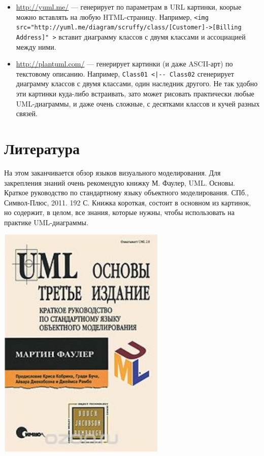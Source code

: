 \documentclass[a5paper]{article}
\newlength\Colsep
\begin{document}
\begin{itemize}
\begin{itemize}
		\item \url{http://yuml.me/} --- генерирует по параметрам в URL картинки, коорые можно вставлять на любую HTML-страницу. Например, \verb|<img src="http://yuml.me/diagram/scruffy/class/[Customer]->[Billing Address]" >| вставит диаграмму классов с двумя классами и ассоциацией между ними.
		\item \url{http://plantuml.com/} --- генерирует картинки (и даже ASCII-арт) по текстовому описанию. Например, \verb&Class01 <|-- Class02& сгенерирует диаграмму классов с двумя классами, один наследник другого. Не так удобно эти картинки куда-либо встраивать, зато может рисовать практически любые UML-диаграммы, и даже очень сложные, с десятками классов и кучей разных связей.
	\end{itemize}
\end{itemize}

\section{Литература}

\noindent\begin{minipage}{\textwidth}
	\begin{minipage}[c][6cm][c]{\dimexpr0.7\textwidth-0.5\Colsep\relax}
		На этом заканчивается обзор языков визуального моделирования. Для закрепления знаний очень рекомендую книжку М. Фаулер, UML. Основы. Краткое руководство по стандартному языку объектного моделирования. СПб., Символ-Плюс, 2011. 192 С. Книжка короткая, состоит в основном из картинок, но содержит, в целом, все знания, которые нужны, чтобы использовать на практике UML-диаграммы.
	\end{minipage}\hfill
	\begin{minipage}[c][6cm][c]{\dimexpr0.3\textwidth-0.5\Colsep\relax}
		\includegraphics[width=0.6\textwidth]{umlBookCover.png}
	\end{minipage}%
\end{minipage}
\end{document}
